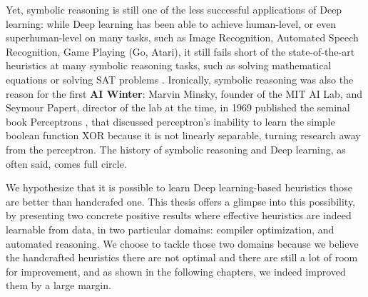 Yet, symbolic reasoning is still one of the less successful applications of Deep learning: while Deep learning has been able to achieve human-level, or even superhuman-level on many tasks, such as Image Recognition, Automated Speech Recognition, Game Playing (Go, Atari), it still fails short of the state-of-the-art heuristics at many symbolic reasoning tasks, such as solving mathematical equations \cite{lample2019deep} or solving SAT problems \cite{neuralsat}. Ironically, symbolic reasoning was also the reason for the first \textbf{AI Winter}: Marvin Minsky, founder of the MIT AI Lab, and Seymour Papert, director of the lab at the time, in 1969 published the seminal book Perceptrons \cite{perceptrons}, that discussed perceptron's inability to learn the simple boolean function XOR because it is not linearly separable, turning research away from the perceptron. The history of symbolic reasoning and Deep learning, as often said, comes full circle.

We hypothesize that it is possible to learn Deep learning-based heuristics those are better than handcrafed one. This thesis offers a glimpse into this possibility, by presenting two concrete positive results where effective heuristics are indeed learnable from data, in two particular domains: compiler optimization, and automated reasoning. We choose to tackle those two domains because we believe the handcrafted heuristics there are not optimal and there are still a lot of room for improvement, and as shown in the following chapters, we indeed improved them by a large margin.




